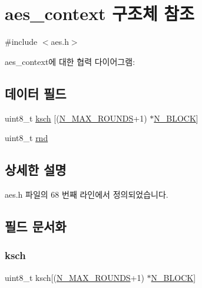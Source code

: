 \hypertarget{structaes__context}{}\section{aes\+\_\+context 구조체 참조}
\label{structaes__context}


{\ttfamily \#include $<$aes.\+h$>$}



aes\+\_\+context에 대한 협력 다이어그램\+:
\subsection*{데이터 필드}
\begin{DoxyCompactItemize}
\item 
uint8\+\_\+t \mbox{\hyperlink{structaes__context_a4a906db8aa15b44c3df5838cbd99cb1d}{ksch}} \mbox{[}(\mbox{\hyperlink{aes_8h_af8b900ecc3a113f2aed001ac9e1cb11e}{N\+\_\+\+M\+A\+X\+\_\+\+R\+O\+U\+N\+DS}}+1) $\ast$\mbox{\hyperlink{aes_8h_a64c8b1a34c03210cc4c214735bb4f186}{N\+\_\+\+B\+L\+O\+CK}}\mbox{]}
\item 
uint8\+\_\+t \mbox{\hyperlink{structaes__context_ad1a4ecf3125fbcc9447f70f7361f2fb0}{rnd}}
\end{DoxyCompactItemize}


\subsection{상세한 설명}


aes.\+h 파일의 68 번째 라인에서 정의되었습니다.



\subsection{필드 문서화}
\mbox{\label{structaes__context_a4a906db8aa15b44c3df5838cbd99cb1d}} 
\subsubsection{\texorpdfstring{ksch}{ksch}}
{\footnotesize\ttfamily uint8\+\_\+t ksch\mbox{[}(\mbox{\hyperlink{aes_8h_af8b900ecc3a113f2aed001ac9e1cb11e}{N\+\_\+\+M\+A\+X\+\_\+\+R\+O\+U\+N\+DS}}+1) $\ast$\mbox{\hyperlink{aes_8h_a64c8b1a34c03210cc4c214735bb4f186}{N\+\_\+\+B\+L\+O\+CK}}\mbox{]}}



